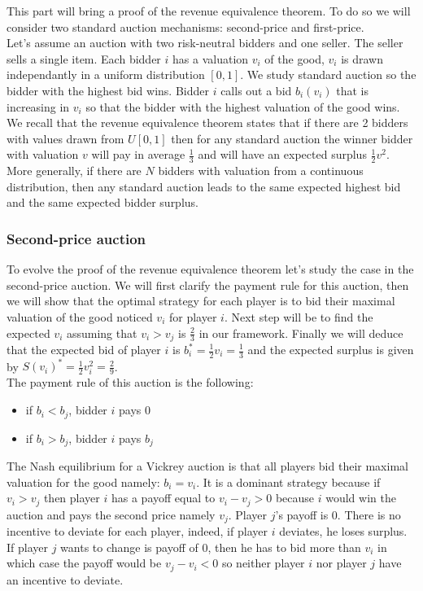 \documentclass[12pt]{article}
\begin{document}
This part will bring a proof of the revenue equivalence theorem. To do so we will consider two standard auction mechanisms: second-price and first-price.\\
Let's assume an auction with two risk-neutral bidders and one seller. The seller sells a single item. Each bidder $i$ has a valuation $v_i$ of the good, $v_i$ is drawn independantly in a uniform distribution $[0,1]$. We study standard auction so the bidder with the highest bid wins. Bidder $i$ calls out a bid $b_i(v_i)$ that is increasing in $v_i$ so that the bidder with the highest valuation of the good wins. We recall that the revenue equivalence theorem states that if there are 2 bidders with values drawn from $U[0,1]$ then for any standard auction the winner bidder with valuation $v$ will pay in average $\frac{1}{3}$ and will have an expected surplus $\frac{1}{2}v^2$. More generally, if there are $N$ bidders with valuation from a continuous distribution, then any standard auction leads to the same expected highest bid and the same expected bidder surplus. 

\subsubsection{Second-price auction}
To evolve the proof of the revenue equivalence theorem let's study the case in the second-price auction. We will first clarify the payment rule for this auction, then we will show that the optimal strategy for each player is to bid their maximal valuation of the good noticed $v_i$ for player $i$. Next step will be to find the expected $v_i$ assuming that $v_i > v_j$ is $\frac{2}{3}$ in our framework. Finally we will deduce that the expected bid of player $i$ is $b_i^* = \frac{1}{2}v_i = \frac{1}{3}$ and the expected surplus is given by $S(v_i)^* = \frac{1}{2}v_i^2 = \frac{2}{9}$.\\

\noindent The payment rule of this auction is the following: 
\begin{itemize}
	\item if $b_i < b_j$, bidder $i$ pays $0$
	\item if $b_i > b_j$, bidder $i$ pays $b_j$
\end{itemize}
The Nash equilibrium for a Vickrey auction is that all players bid their maximal valuation for the good namely: $b_i = v_i$. It is a dominant strategy because if $v_i > v_j$ then player $i$ has a payoff equal to $v_i - v_j > 0$ because $i$ would win the auction and pays the second price namely $v_j$. Player $j$'s payoff is 0. There is no incentive to deviate for each player, indeed, if player $i$ deviates, he loses surplus. If player $j$ wants to change is payoff of 0, then he has to bid more than $v_i$ in which case the payoff would be $v_j - v_i < 0$ so neither player $i$ nor player $j$ have an incentive to deviate.\\
\end{document}
